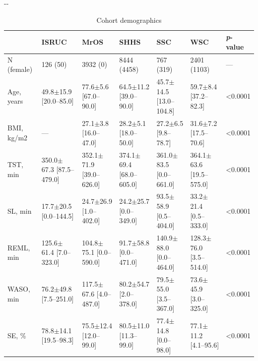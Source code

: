 \begin{landscape}
\begin{table}[tb]
\begin{adjustwidth*}{}{-\marginparwidth-\marginparsep}
\centering
\small
\begin{threeparttable}
\caption{Cohort demographics}
\label{tab:sleep-stages:paperii:table-01}
\begin{tabular}{@{}lllllll@{}}
\toprule
           & \textbf{\ac{ISRUC}}                             & \textbf{\ac{MrOS}}                              & \textbf{\ac{SHHS}}                              & \textbf{\ac{SSC}}                               &\textbf{\ac{WSC}}                               & \textbf{\textit{p}-value}   \\ \midrule
N (female) & 126 (50)                          & 3932 (0)                          & 8444 (4458)                       & 767 (319)                         & 2401 (1103)                       & ---         \\
Age, years & 49.8$\pm$15.9 {[}20.0--85.0{]}   & 77.6$\pm$5.6 {[}67.0--90.0{]}    & 64.5$\pm$11.2 {[}39.0--90.0{]}   & 45.7$\pm$14.5 {[}13.0--104.8{]}  & 59.7$\pm$8.4 {[}37.2--82.3{]}    & \num{<0.0001}         \\
BMI, kg/m2 & ---       & 27.1$\pm$3.8 {[}16.0--47.0{]}    & 28.2$\pm$5.1 {[}18.0--50.0{]}    & 27.2$\pm$6.5 {[}9.8--78.7{]}     & 31.6$\pm$7.2 {[}17.5--70.6{]}    & \num{<0.0001} \\
TST, min   & 350.0$\pm$67.3 {[}87.5--479.0{]} & 352.1$\pm$71.9 {[}39.0--626.0{]} & 374.1$\pm$69.4 {[}68.0--605.0{]} & 361.0$\pm$83.5 {[}0.0--661.0{]}  & 364.1$\pm$63.6 {[}19.5--575.0{]} & \num{<0.0001}  \\
SL, min    & 17.7$\pm$20.5 {[}0.0--144.5{]}   & 24.7$\pm$26.9 {[}1.0--402.0{]}   & 24.2$\pm$25.7 {[}0.0--349.0{]}   & 93.5$\pm$58.9 {[}0.5--404.0{]}   & 33.2$\pm$21.4 {[}0.5--333.0{]}   & \num{<0.0001}         \\
REML, min  & 125.6$\pm$61.4 {[}7.0--323.0{]}  & 104.8$\pm$75.1 {[}0.0--590.0{]}  & 91.7$\pm$58.8 {[}0.0--471.0{]}   & 140.9$\pm$88.0 {[}0.0--464.0{]}  & 128.3$\pm$76.0 {[}3.5--514.0{]}  & \num{<0.0001} \\
WASO, min  & 76.2$\pm$49.8 {[}7.5--251.0{]}   & 117.5$\pm$67.6 {[}4.0--487.0{]}  & 80.2$\pm$54.7 {[}2.0--378.0{]}   & 79.5$\pm$55.0 {[}3.5--367.0{]}   & 73.6$\pm$45.9 {[}3.0--325.0{]}   & \num{<0.0001} \\
SE, \%     & 78.8$\pm$14.1 {[}19.5--98.3{]}   & 75.5$\pm$12.4 {[}12.0--99.0{]}   & 80.5$\pm$11.0 {[}11.3--99.0{]}   & 77.4$\pm$14.8 {[}0.0--98.0{]}    & 77.1$\pm$11.2 {[}4.1--95.6{]}    & \num{<0.0001} \\

\end{tabular}
\end{threeparttable}
\end{adjustwidth*}
\end{table}
\end{landscape}
